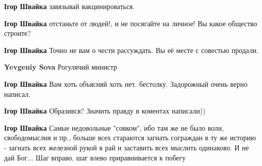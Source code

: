 \begin{itemize}
\begin{itemize}
\textbf{Ігор Швайка} завязывай вакцинироваться.

 
\textbf{Ігор Швайка} отстаньте от людей!, и не посягайте на личное! Вы какое общество строите?

 
\textbf{Ігор Швайка} Точно не вам о чести рассуждать. Вы её месте с совестью продали.

 
\textbf{Yevgeniy Sova} Рогулячий министр🤣

 
\textbf{Ігор Швайка} Вам хоть объясняй хоть нет. бестолку. Задорожный очень верно написал.

 
\textbf{Ігор Швайка} Образився? Значить правду в коментах написали))

 
\textbf{Ігор Швайка} Самые недовольные "совком", ибо там же не было воли,
свободомыслия и пр., больше всех стараются загнать сограждан в ту же историю -
загнать всех железной рукой в рай и заставить всех мыслить одинаково. И не дай
Бог... Шаг вправо, шаг влево приравнивается к побегу


\end{itemize}
\end{itemize}
